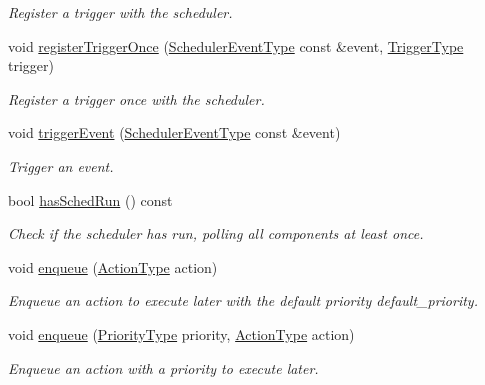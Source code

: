 \begin{DoxyCompactItemize}
\begin{DoxyCompactList}\small\item\em Register a trigger with the scheduler. \end{DoxyCompactList}\item 
void \hyperlink{structvt_1_1sched_1_1_scheduler_ac6faee91832e52305c2e6ab28e1b3040}{register\+Trigger\+Once} (\hyperlink{namespacevt_1_1sched_a54756ec39b60951d6765fcfa692d1616}{Scheduler\+Event\+Type} const \&event, \hyperlink{structvt_1_1sched_1_1_scheduler_aa0c06d6e1c31a5f1c3db474036ad7d29}{Trigger\+Type} trigger)
\begin{DoxyCompactList}\small\item\em Register a trigger once with the scheduler. \end{DoxyCompactList}\item 
void \hyperlink{structvt_1_1sched_1_1_scheduler_a1bbc574a084b361bf0c88d24882ef08b}{trigger\+Event} (\hyperlink{namespacevt_1_1sched_a54756ec39b60951d6765fcfa692d1616}{Scheduler\+Event\+Type} const \&event)
\begin{DoxyCompactList}\small\item\em Trigger an event. \end{DoxyCompactList}\item 
bool \hyperlink{structvt_1_1sched_1_1_scheduler_ac7a9512a4a616d51915d5dfee84ff986}{has\+Sched\+Run} () const
\begin{DoxyCompactList}\small\item\em Check if the scheduler has run, polling all components at least once. \end{DoxyCompactList}\item 
void \hyperlink{structvt_1_1sched_1_1_scheduler_a82a78f782999127d461208bc948268a4}{enqueue} (\hyperlink{namespacevt_ae0a5a7b18cc99d7b732cb4d44f46b0f3}{Action\+Type} action)
\begin{DoxyCompactList}\small\item\em Enqueue an action to execute later with the default priority {\ttfamily default\+\_\+priority}. \end{DoxyCompactList}\item 
void \hyperlink{structvt_1_1sched_1_1_scheduler_afb1616da4dfb63b8a83e15af720d9f3f}{enqueue} (\hyperlink{namespacevt_a86bff9f556eb761b27fc8600d006ac04}{Priority\+Type} priority, \hyperlink{namespacevt_ae0a5a7b18cc99d7b732cb4d44f46b0f3}{Action\+Type} action)
\begin{DoxyCompactList}\small\item\em Enqueue an action with a priority to execute later. \end{DoxyCompactList}\item 

\end{DoxyCompactItemize}

